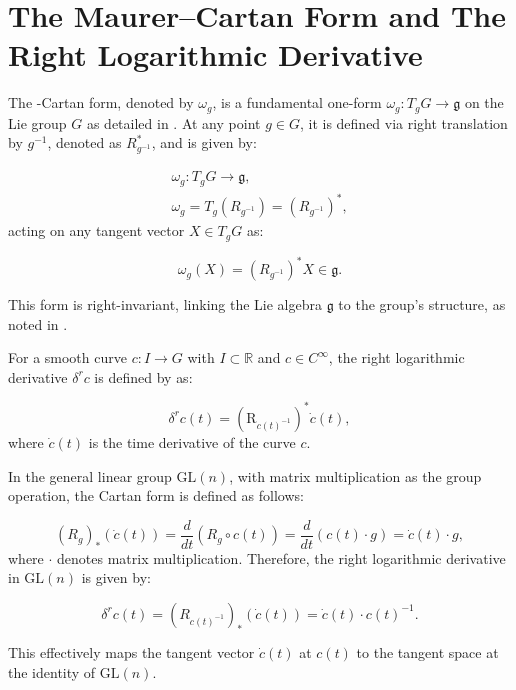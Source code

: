 \newpage
\section{The Maurer–Cartan Form and The Right Logarithmic Derivative}
\label{maurer-cartan-form-and-right-log-der}

The 
-Cartan form, denoted by \(\omega_g\), is a fundamental one-form \(\omega_g : T_gG \to \mathfrak{g}\) on the Lie group \(G\) as detailed in \cite[p.~373]{krieglConvenientSettingGlobal}. At any point \(g \in G\), it is defined via right translation by \(g^{-1}\), denoted as \(R_{g^{-1}}^*\), and is given by:

\begin{align}
    \omega_g : T_gG \rightarrow \mathfrak{g}, \nonumber \\
    \omega_g = T_g(R_{g^{-1}}) = (R_{g^{-1}})^*,
    \label{eq:maurer-cartan-form}
\end{align}
acting on any tangent vector \(X \in T_gG\) as:

\begin{equation}
    \omega_g(X) = (R_{g^{-1}})^*X \in \mathfrak{g}.
    \label{eq:maurer-cartan-form-on-element}
\end{equation}

This form is right-invariant, linking the Lie algebra \(\mathfrak{g}\) to the group's structure, as noted in \cite[p.~71]{olverEquivalenceInvariantsSymmetry1995}.

For a smooth curve \(c: I \to G\) with \(I \subset \mathbb{R}\) and \(c \in C^\infty\), the right logarithmic derivative \(\delta^r c\) is defined by \cite{krieglConvenientSettingGlobal} as:

\begin{equation}
    \delta^r c(t) = (\mathrm{R}_{c(t)^{-1}})^* \dot{c}(t),
\end{equation}
where \(\dot{c}(t)\) is the time derivative of the curve \(c\).

In the general linear group \(\mathrm{GL}(n)\), with matrix multiplication as the group operation, the Cartan form is defined as follows:

\begin{equation}
    (R_g)_* (\dot{c}(t)) = \frac{d}{dt}(R_g \circ c(t)) = \frac{d}{dt}(c(t) \cdot g) = \dot{c}(t) \cdot g,
    \label{eq:right-log-derivative-gl}
\end{equation}
where \(\cdot\) denotes matrix multiplication. Therefore, the right logarithmic derivative in \(\mathrm{GL}(n)\) is given by:

\begin{equation}
    \delta^r c(t) = (R_{c(t)^{-1}})_* (\dot{c}(t)) = \dot{c}(t) \cdot c(t)^{-1}.
    \label{eq:maurer-cartan-gl}
\end{equation}

This effectively maps the tangent vector \(\dot{c}(t)\) at \(c(t)\) to the tangent space at the identity of \(\mathrm{GL}(n)\).